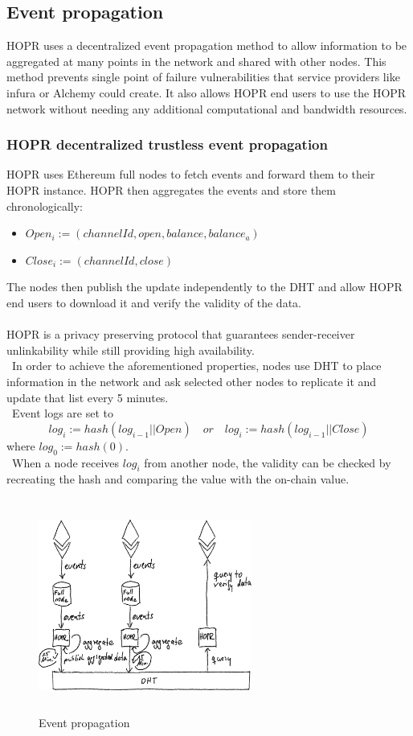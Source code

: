 \subsection{Event propagation}
HOPR uses a decentralized event propagation method to allow information to be aggregated at many points in the network and shared with other nodes. 
This method prevents single point of failure vulnerabilities that service providers like infura or Alchemy could create. 
It also allows HOPR end users to use the HOPR network without needing any additional computational and bandwidth resources.  
\subsubsection*{HOPR decentralized trustless event propagation} 
HOPR uses Ethereum full nodes to fetch events and forward them to their HOPR instance. 
HOPR then aggregates the events and store them chronologically:
\begin{itemize}
    \item $Open_i:=(channelId, open, balance, balance_a)$
    \item $Close_i:=(channelId, close)$
\end{itemize}
The nodes then publish the update independently to the DHT and allow HOPR end users to download it and verify the validity of the data.
\\~\\HOPR is a privacy preserving protocol that guarantees sender-receiver unlinkability while still providing high availability.
\\~In order to achieve the aforementioned properties, nodes use DHT to place information in the network and ask selected other nodes to replicate it and update that list every 5 minutes. 
\\~Event logs are set to $$log_i:=hash( log_{i-1}|| Open) \quad or \quad log_i:=hash( log_{i-1}|| Close )$$ where $log_0:=hash(0)$.
\\~When a node receives $log_i$ from another node, the validity can be checked by recreating the hash and comparing the value with the on-chain value.


\begin{figure}[H]
    \centering
    \includegraphics[width=7cm,height=7cm,keepaspectratio]{../whitepaper/images/event_propagation.png}
    \caption{Event propagation}
    \label{fig:Event propagation}
\end{figure}



